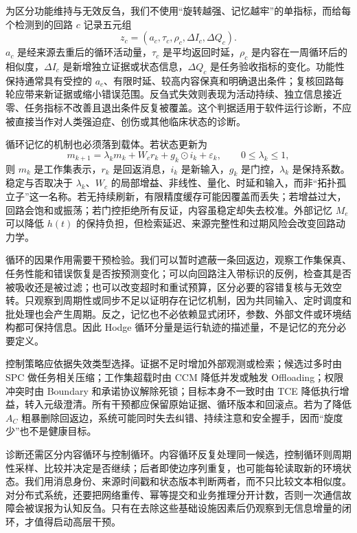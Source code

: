 为区分功能维持与无效反刍，我们不使用“旋转越强、记忆越牢”的单指标，而给每个检测到的回路 $c$ 记录五元组
\[
  z_c=(a_c,\tau_c,\rho_c,\Delta I_c,\Delta Q_c).
\]
$a_c$ 是经来源去重后的循环活动量，$\tau_c$ 是平均返回时延，$\rho_c$ 是内容在一周循环后的相似度，$\Delta I_c$ 是新增独立证据或状态信息，$\Delta Q_c$ 是任务验收指标的变化。功能性保持通常具有受控的 $a_c$、有限时延、较高内容保真和明确退出条件；复核回路每轮应带来新证据或缩小错误范围。反刍式失效则表现为活动持续、独立信息接近零、任务指标不改善且退出条件反复被覆盖。这个判据适用于软件运行诊断，不应被直接当作对人类强迫症、创伤或其他临床状态的诊断。

循环记忆的机制也必须落到载体。若状态更新为
\begin{equation}
  m_{k+1}=\lambda_k m_k+W_c r_k+g_k\odot i_k+\varepsilon_k,
  \qquad 0\leq\lambda_k\leq 1,
  \label{eq:rheology_recurrent_memory}
\end{equation}
则 $m_k$ 是工作集表示，$r_k$ 是回返消息，$i_k$ 是新输入，$g_k$ 是门控，$\lambda_k$ 是保持系数。稳定与否取决于 $\lambda_k$、$W_c$ 的局部增益、非线性、量化、时延和输入，而非“拓扑孤立子”这一名称。若无持续刷新，有限精度缓存可能因覆盖而丢失；若增益过大，回路会饱和或振荡；若门控拒绝所有反证，内容虽稳定却失去校准。外部记忆 $M_e$ 可以降低 $h(t)$ 的保持负担，但检索延迟、来源完整性和过期风险会改变回路动力学。

循环的因果作用需要干预检验。我们可以暂时遮蔽一条回返边，观察工作集保真、任务性能和错误恢复是否按预测变化；可以向回路注入带标识的反例，检查其是否被吸收还是被过滤；也可以改变超时和重试预算，区分必要的容错复核与无效空转。只观察到周期性或同步不足以证明存在记忆机制，因为共同输入、定时调度和批处理也会产生周期。反之，记忆也不必依赖显式闭环，参数、外部文件或环境结构都可保持信息。因此 Hodge 循环分量是运行轨迹的描述量，不是记忆的充分必要定义。

控制策略应依据失效类型选择。证据不足时增加外部观测或检索；候选过多时由 SPC 做任务相关压缩；工作集超载时由 CCM 降低并发或触发 Offloading；权限冲突时由 Boundary 和承诺协议解除死锁；目标本身不一致时由 TCE 降低执行增益，转入元级澄清。所有干预都应保留原始证据、循环版本和回滚点。若为了降低 $A_C$ 粗暴删除回返边，系统可能同时失去纠错、持续注意和安全握手，因而“旋度少”也不是健康目标。

诊断还需区分内容循环与控制循环。内容循环反复处理同一候选，控制循环则周期性采样、比较并决定是否继续；后者即使边序列重复，也可能每轮读取新的环境状态。我们用消息身份、来源时间戳和状态版本判断两者，而不只比较文本相似度。对分布式系统，还要把网络重传、幂等提交和业务推理分开计数，否则一次通信故障会被误报为认知反刍。只有在去除这些基础设施因素后仍观察到无信息增量的闭环，才值得启动高层干预。

